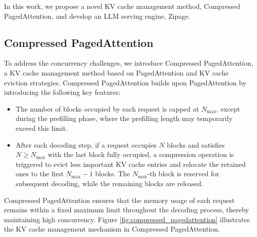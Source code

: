 \documentclass[11pt]{article}
\begin{document}
In this work, we propose a novel KV cache management method, Compressed PagedAttention, and develop an LLM serving engine, Zipage.


\subsection{Compressed PagedAttention}




To address the concurrency challenges, we introduce Compressed PagedAttention, a KV cache management method based on PagedAttention and KV cache eviction strategies.  Compressed PagedAttention builds upon PagedAttention by introducing the following key features:
\begin{itemize}
    \item The number of blocks occupied by each request is capped at $N_{\max}$, except during the prefilling phase, where the prefilling length may temporarily exceed this limit.
    \item After each decoding step, if a request occupies $N$ blocks and satisfies $N \ge N_{\max}$ with the last block fully occupied, a compression operation is triggered to evict less important KV cache entries and relocate the retained ones to the first $N_{\max} - 1$ blocks. The $N_{\max}$-th block is reserved for subsequent decoding, while the remaining blocks are released.
\end{itemize}
Compressed PagedAttention ensures that the memory usage of each request remains within a fixed maximum limit throughout the decoding process, thereby maintaining  high concurrency. Figure \ref{fig:compressed_pagedattention} illustrates the KV cache management mechanism in Compressed PagedAttention.
\end{document}
